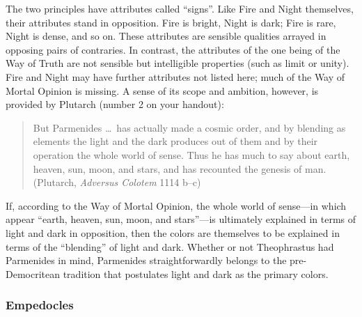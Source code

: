 The two principles have attributes called ``signs''. Like Fire and Night themselves, their attributes stand in opposition. Fire is bright, Night is dark; Fire is rare, Night is dense, and so on. These attributes are sensible qualities arrayed in opposing pairs of contraries. In contrast, the attributes of the one being of the Way of Truth are not sensible but intelligible properties (such as limit or unity). Fire and Night may have further attributes not listed here; much of the Way of Mortal Opinion is missing. A sense of its scope and ambition, however, is provided by Plutarch (number 2 on your handout):
\begin{quote}
    But Parmenides \ldots\ has actually made a cosmic order, and by blending as elements the light and the dark produces out of them and by their operation the whole world of sense. Thus he has much to say about earth, heaven, sun, moon, and stars, and has recounted the genesis of man. (Plutarch, \emph{Adversus Colotem} 1114 b--c)
\end{quote}
If, according to the Way of Mortal Opinion, the whole world of sense---in which appear ``earth, heaven, sun, moon, and stars''---is ultimately explained in terms of light and dark in opposition, then the colors are themselves to be explained in terms of the ``blending'' of light and dark. Whether or not Theophrastus had Parmenides in mind, Parmenides straightforwardly belongs to the pre-Democritean tradition that postulates light and dark as the primary colors. \change


\begin{frame}[t]\frametitle{Empedocles}
	
\end{frame}


